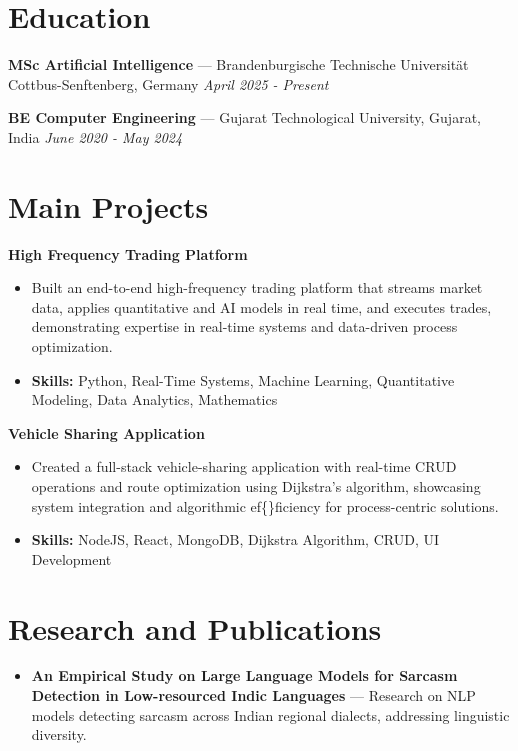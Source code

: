 \documentclass[a4paper,10pt]{article}
\begin{document}
\section*{Education}
\textbf{MSc Artificial Intelligence} — Brandenburgische Technische Universität Cottbus-Senftenberg, Germany \hfill \textit{April 2025 - Present}\par
\vspace{1.5pt}
\textbf{BE Computer Engineering} — Gujarat Technological University, Gujarat, India \hfill \textit{June 2020 - May 2024}\par

\section*{Main Projects}
\textbf{High Frequency Trading Platform}\par
\vspace{1pt}
\begin{itemize}
  \item Built an end-to-end high-frequency trading platform that streams market data, applies quantitative and AI models in real time, and executes trades, demonstrating expertise in real-time systems and data-driven process optimization.
  \item \textbf{Skills:} Python, Real-Time Systems, Machine Learning, Quantitative Modeling, Data Analytics, Mathematics
\end{itemize}
\vspace{3pt}
\textbf{Vehicle Sharing Application}\par
\vspace{1pt}
\begin{itemize}
  \item Created a full-stack vehicle-sharing application with real-time CRUD operations and route optimization using Dijkstra's algorithm, showcasing system integration and algorithmic ef\{\}ficiency for process-centric solutions.
  \item \textbf{Skills:} NodeJS, React, MongoDB, Dijkstra Algorithm, CRUD, UI Development
\end{itemize}

\section*{Research and Publications}
\begin{itemize}
\item \textbf{An Empirical Study on Large Language Models for Sarcasm Detection in Low-resourced Indic Languages} — Research on NLP models detecting sarcasm across Indian regional dialects, addressing linguistic diversity.
\end{itemize}
\end{document}
